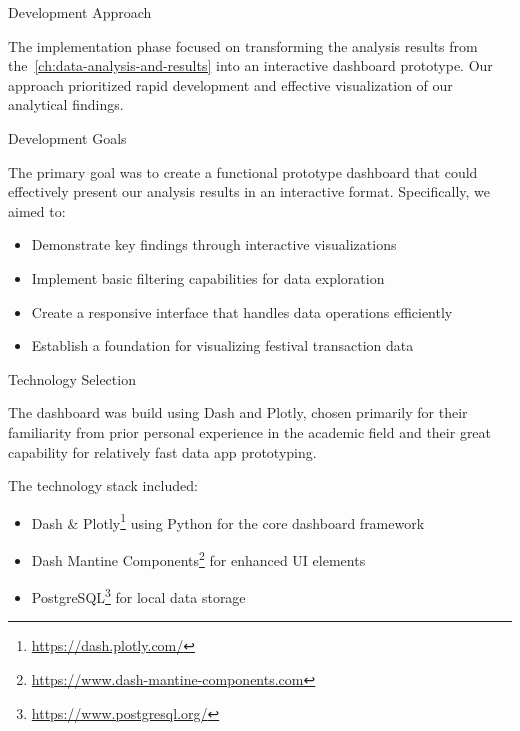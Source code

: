 \begin{section}{Development Approach}
	\label{sec:implementation-development-approach}

	The implementation phase focused on transforming the analysis results from the~\autoref{ch:data-analysis-and-results} into an interactive dashboard prototype.
	Our approach prioritized rapid development and effective visualization of our analytical findings.

	\begin{subsection}{Development Goals}
		\label{subsec:implementation-development-approach-goals}

		The primary goal was to create a functional prototype dashboard that could effectively present our analysis results in an interactive format.
		Specifically, we aimed to:
		\begin{itemize}
			\item Demonstrate key findings through interactive visualizations
			\item Implement basic filtering capabilities for data exploration
			\item Create a responsive interface that handles data operations efficiently
			\item Establish a foundation for visualizing festival transaction data
		\end{itemize}

	\end{subsection}

	\begin{subsection}{Technology Selection}
		\label{subsec:implementation-development-approach-technology}

		The dashboard was build using Dash and Plotly, chosen primarily for their familiarity from prior personal experience in the academic field and their great capability for relatively fast data app prototyping\cite{plotly_dash_plotly_com}.

		The technology stack included:
		\begin{itemize}
			\item Dash \& Plotly\footnote{\url{https://dash.plotly.com/}} using Python for the core dashboard framework
			\item Dash Mantine Components\footnote{\url{https://www.dash-mantine-components.com}} for enhanced UI elements
			\item PostgreSQL\footnote{\url{https://www.postgresql.org/}} for local data storage
		\end{itemize}


\end{subsection}
\end{section}
